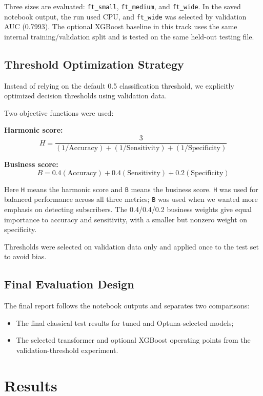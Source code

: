 \documentclass[10pt,twocolumn]{article}
\begin{document}
Three sizes are evaluated: \texttt{ft\_small}, \texttt{ft\_medium}, and \texttt{ft\_wide}. In the saved notebook output, the run used CPU, and \texttt{ft\_wide} was selected by validation AUC (0.7993). The optional XGBoost baseline in this track uses the same internal training/validation split and is tested on the same held-out testing file.

\subsection{Threshold Optimization Strategy}

Instead of relying on the default 0.5 classification threshold, we explicitly optimized decision thresholds using validation data.

Two objective functions were used:

\textbf{Harmonic score:}
\[
H=\frac{3}{(1/\text{Accuracy})+(1/\text{Sensitivity})+(1/\text{Specificity})}
\]

\textbf{Business score:}
\[
B=0.4(\text{Accuracy})+0.4(\text{Sensitivity})+0.2(\text{Specificity})
\]

Here \texttt{H} means the harmonic score and \texttt{B} means the business score. \texttt{H} was used for balanced performance across all three metrics; \texttt{B} was used when we wanted more emphasis on detecting subscribers. The 0.4/0.4/0.2 business weights give equal importance to accuracy and sensitivity, with a smaller but nonzero weight on specificity.

Thresholds were selected on validation data only and applied once to the test set to avoid bias.

\subsection{Final Evaluation Design}

The final report follows the notebook outputs and separates two comparisons:

\begin{itemize}
  \item The final classical test results for tuned and Optuna-selected models;
  \item The selected transformer and optional XGBoost operating points from the validation-threshold experiment.
\end{itemize}

\section{Results}
\end{document}
